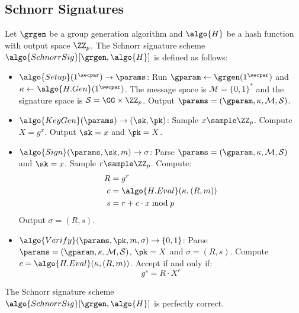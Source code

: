 \subsection{Schnorr Signatures}

\begin{definition}\label{def:schnorr}
  Let $\grgen$ be a group generation algorithm and $\algo{H}$ be a hash function with output space $\ZZ_p$. The Schnorr signature scheme $\algo{SchnorrSig}[\grgen, \algo{H}]$ is defined as follows:
  \begin{itemize}
    \item $\algo{Setup}(1^\secpar) \rightarrow \params$: Run $\gparam \gets \grgen(1^\secpar)$ and $\kappa \gets \algo{H.Gen}(1^\secpar)$. The message space is $\mathcal{M} = \{0,1\}^*$ and the signature space is $\mathcal{S} = \GG \times \ZZ_p$. Output $\params = (\gparam, \kappa, \mathcal{M}, \mathcal{S})$.
    
    \item $\algo{KeyGen}(\params) \rightarrow (\sk, \pk)$: Sample $x \sample \ZZ_p$. Compute $X = g^x$. Output $\sk = x$ and $\pk = X$.
    
    \item $\algo{Sign}(\params, \sk, m) \rightarrow \sigma$: Parse $\params = (\gparam, \kappa, \mathcal{M}, \mathcal{S})$ and $\sk = x$. Sample $r \sample \ZZ_p$. Compute:
    \begin{align*}
      R &= g^r \\
      c &= \algo{H.Eval}(\kappa, (R, m)) \\
      s &= r + c \cdot x \bmod p
    \end{align*}
    Output $\sigma = (R, s)$.
    
    \item $\algo{Verify}(\params, \pk, m, \sigma) \rightarrow \{0, 1\}$: Parse $\params = (\gparam, \kappa, \mathcal{M}, \mathcal{S})$, $\pk = X$ and $\sigma = (R, s)$. Compute $c = \algo{H.Eval}(\kappa, (R, m))$. Accept if and only if:
    \[
      g^s = R \cdot X^c
    \]
  \end{itemize}
\end{definition}

\begin{lemma}\label{lem:schnorr-correctness}
  The Schnorr signature scheme\\ $\algo{SchnorrSig}[\grgen, \algo{H}]$ is perfectly correct.
\end{lemma}

